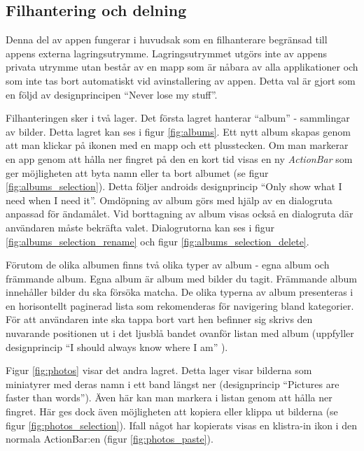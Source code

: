 \documentclass[11px, a4paper]{article}
\begin{document}
\subsection{Filhantering och delning}

	Denna del av appen fungerar i huvudsak som en filhanterare begränsad till appens externa lagringsutrymme. Lagringsutrymmet utgörs inte av appens privata utrymme utan består av en mapp som är nåbara av alla applikationer och som inte tas bort automatiskt vid avinstallering av appen. Detta val är gjort som en följd av designprincipen ``Never lose my stuff''\cite{Principles}.

	Filhanteringen sker i två lager. Det första lagret hanterar ``album'' - sammlingar av bilder. Detta lagret kan ses i figur \ref{fig:albums}. Ett nytt album skapas genom att man klickar på ikonen med en mapp och ett plusstecken. Om man markerar en app genom att hålla ner fingret på den en kort tid visas en ny \emph{ActionBar}\cite{ContextActionBar} som ger möjligheten att byta namn eller ta bort albumet (se figur \ref{fig:albums_selection}). Detta följer androids designprincip ``Only show what I need when I need it''\cite{Principles}. Omdöpning av album görs med hjälp av en dialogruta anpassad för ändamålet. Vid borttagning av album visas också en dialogruta där användaren måste bekräfta valet\cite{Dialogs}. Dialogrutorna kan ses i figur \ref{fig:albums_selection_rename} och figur \ref{fig:albums_selection_delete}.

	Förutom de olika albumen finns två olika typer av album - egna album och främmande album. Egna album är album med bilder du tagit. Främmande album innehåller bilder du ska försöka matcha. De olika typerna av album presenteras i en horisontellt paginerad lista som rekomenderas för navigering bland kategorier\cite{HorizontalPaging}. För att användaren inte ska tappa bort vart hen befinner sig skrivs den nuvarande positionen ut i det ljusblå bandet ovanför listan med album (uppfyller designprincip ``I should always know where I am''\cite{Principles} ).

	Figur \ref{fig:photos} visar det andra lagret. Detta lager visar bilderna som miniatyrer med deras namn i ett band längst ner (designprincip ``Pictures are faster than words''\cite{Principles}). Även här kan man markera i listan genom att hålla ner fingret. Här ges dock även möjligheten att kopiera eller klippa ut bilderna (se figur \ref{fig:photos_selection}). Ifall något har kopierats visas en klistra-in ikon i den normala ActionBar:en (figur \ref{fig:photos_paste}).
\end{document}
